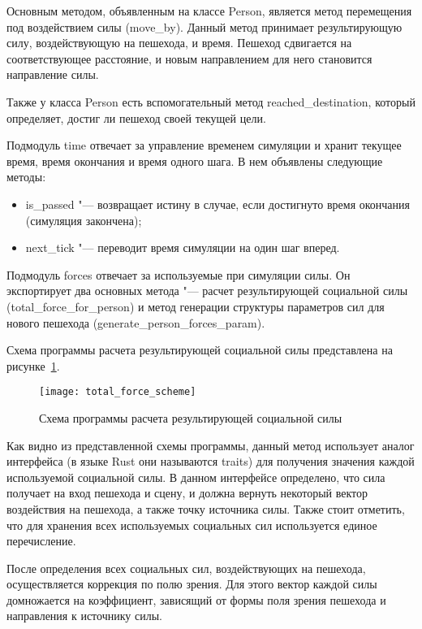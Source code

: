 Основным методом, объявленным на классе Person, является метод перемещения под воздействием силы (move\_by).
Данный метод принимает результирующую силу, воздействующую на пешехода, и время.
Пешеход сдвигается на соответствующее расстояние, и новым направлением для него становится направление силы.

Также у класса Person есть вспомогательный метод reached\_destination, который определяет, достиг ли пешеход своей текущей цели.

Подмодуль time отвечает за управление временем симуляции и хранит текущее время, время окончания и время одного шага.
В нем объявлены следующие методы:
\begin{itemize}
  \item is\_passed "--- возвращает истину в случае, если достигнуто время окончания (симуляция закончена);
  \item next\_tick "--- переводит время симуляции на один шаг вперед.
\end{itemize}

Подмодуль forces отвечает за используемые при симуляции силы.
Он экспортирует два основных метода "--- расчет результирующей социальной силы (total\_force\_for\_person)
и метод генерации структуры параметров сил для нового пешехода (generate\_person\_forces\_param).

Схема программы расчета результирующей социальной силы представлена на рисунке~\ref{sec:development:core:total_force_calc_pic}.

\begin{figure}[!ht]
  \centering
  \texttt{[image: total\_force\_scheme]}
  \caption{Схема программы расчета результирующей социальной силы}
  \label{sec:development:core:total_force_calc_pic}
\end{figure}

Как видно из представленной схемы программы, данный метод использует аналог интерфейса (в языке Rust они называются traits) для получения значения каждой используемой социальной силы.
В данном интерфейсе определено, что сила получает на вход пешехода и сцену, и должна вернуть некоторый вектор воздействия на пешехода, а также точку источника силы.
Также стоит отметить, что для хранения всех используемых социальных сил используется единое перечисление.

После определения всех социальных сил, воздействующих на пешехода, осуществляется коррекция по полю зрения.
Для этого вектор каждой силы домножается на коэффициент, зависящий от формы поля зрения пешехода и направления к источнику силы.

